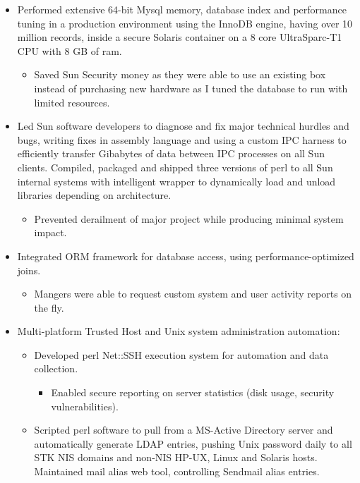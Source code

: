 \documentclass[11pt,a4paper,sans]{moderncv}   %
\begin{document}
{\begin{itemize}
\begin{itemize}
\begin{itemize}
      \end{itemize}
    \end{itemize}
  \item Performed extensive 64-bit Mysql memory, database index and performance tuning in a production environment using the InnoDB engine, having over 10 million records, inside a secure Solaris container on a 8 core UltraSparc-T1 CPU with 8 GB of ram.
    \begin{itemize}
    \item Saved Sun Security money as they were able to use an existing box instead of purchasing new hardware as I tuned the database to run with limited resources.
    \end{itemize}
  \item Led Sun software developers to diagnose and fix major technical hurdles and bugs, writing fixes in assembly language and using a custom IPC harness to efficiently transfer Gibabytes of data between IPC processes on all Sun clients. Compiled, packaged and shipped three versions of perl to all Sun internal systems with intelligent wrapper to dynamically load and unload libraries depending on architecture.
    \begin{itemize}
    \item Prevented derailment of major project while producing minimal system impact.
    \end{itemize}
  \item Integrated ORM framework for database access, using performance-optimized joins.
    \begin{itemize}
    \item Mangers were able to request custom system and user activity reports on the fly.
    \end{itemize}
  \item Multi-platform Trusted Host and Unix system administration automation:
    \begin{itemize}%
    \item Developed perl Net::SSH execution system for automation and data collection.
      \begin{itemize}
      \item Enabled secure reporting on server statistics (disk usage, security vulnerabilities).
      \end{itemize}
    \item Scripted perl software to pull from a MS-Active Directory server and automatically generate LDAP entries, pushing Unix password daily to all STK NIS domains and non-NIS HP-UX, Linux and Solaris hosts. Maintained mail alias web tool, controlling Sendmail alias entries.
    \end{itemize}
  \end{itemize}
}
\end{document}
